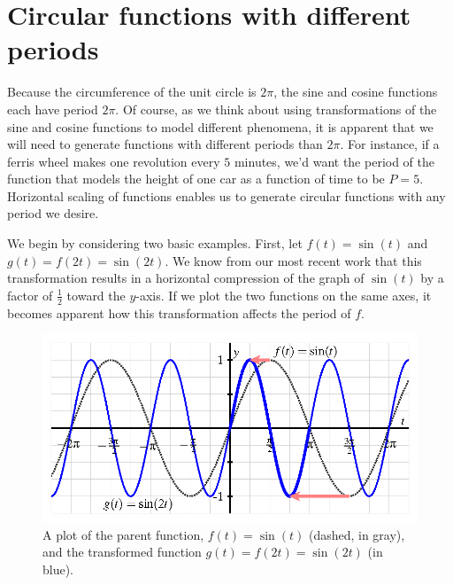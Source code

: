 \documentclass{ximera}
\begin{document}
\section{Circular functions with different periods}

Because the circumference of the unit circle is \(2\pi\), the sine and cosine functions each have period \(2\pi\).  Of course, as we think about using transformations of the sine and cosine functions to model different phenomena, it is apparent that we will need to generate functions with different periods than \(2\pi\).  For instance, if a ferris wheel makes one revolution every \(5\) minutes, we'd want the period of the function that models the height of one car as a function of time to be \(P = 5\).  Horizontal scaling of functions enables us to generate circular functions with any period we desire.%

We begin by considering two basic examples.  First, let \(f(t) = \sin(t)\) and \(g(t) = f(2t) = \sin(2t)\).  We know from our most recent work that this transformation results in a horizontal compression of the graph of \(\sin(t)\) by a factor of \(\frac{1}{2}\) toward the \(y\)-axis.  If we plot the two functions on the same axes, it becomes apparent how this transformation affects the period of \(f\).%
\begin{figure}
\centering
\includegraphics[width=0.75\linewidth]{images/sinusoidal-sine-horiz-scaling.png}
\caption{A plot of the parent function, \(f(t) = \sin(t)\) (dashed, in gray), and the transformed function \(g(t) = f(2t) = \sin(2t)\) (in blue).\label{F-sinusoidal-sine-compressed}}
\end{figure}
\end{document}
